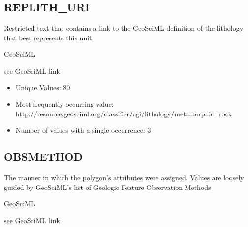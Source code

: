 \documentclass[letterpaper,10pt,english]{sphinxmanual}
\begin{document}
\subsection{REPLITH\_URI}
\label{\detokenize{field_glossary:replith-uri}}
Restricted text that contains a link to the GeoSciML definition of the lithology that best represents this unit.

GeoSciML

see GeoSciML link




\begin{itemize}
\item {} 
Unique Values: 80

\item {} 
Most frequently occurring value: http://resource.geosciml.org/classifier/cgi/lithology/metamorphic\_rock

\item {} 
Number of values with a single occurrence: 3

\end{itemize}


\subsection{OBSMETHOD}
\label{\detokenize{field_glossary:obsmethod}}
The manner in which the polygon’s attributes were assigned. Values are loosely guided by GeoSciML’s list of Geologic Feature Observation Methods

GeoSciML

see GeoSciML link


\end{document}
